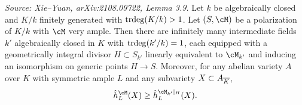 \begin{lemma}
  \label{lem:genericHyperplane}
  \textit{Source: Xie--Yuan, arXiv:2108.09722, Lemma 3.9.}
  Let \(k\) be algebraically closed and \(K/k\) finitely generated with
  \(\operatorname{trdeg}(K/k) > 1\).  Let \((S,\cM)\) be a polarization of \(K/k\) with \(\cM\) very
  ample.  Then there are infinitely many intermediate fields \(k'\) algebraically closed in
  \(K\) with \(\operatorname{trdeg}(k'/k)=1\), each equipped with a geometrically integral divisor
  \(H \subset S_{k'}\) linearly equivalent to \(\cM_{k'}\) and inducing an isomorphism on
  generic points \(H \to S\).  Moreover, for any abelian variety \(A\) over \(K\) with
  symmetric ample \(L\) and any subvariety \(X \subset A_{\overline{K}}\),
  \[
    \hath_L^{\cM}(X) \geq \hath_L^{\cM_{k'}|_H}(X).
  \]
\end{lemma}

